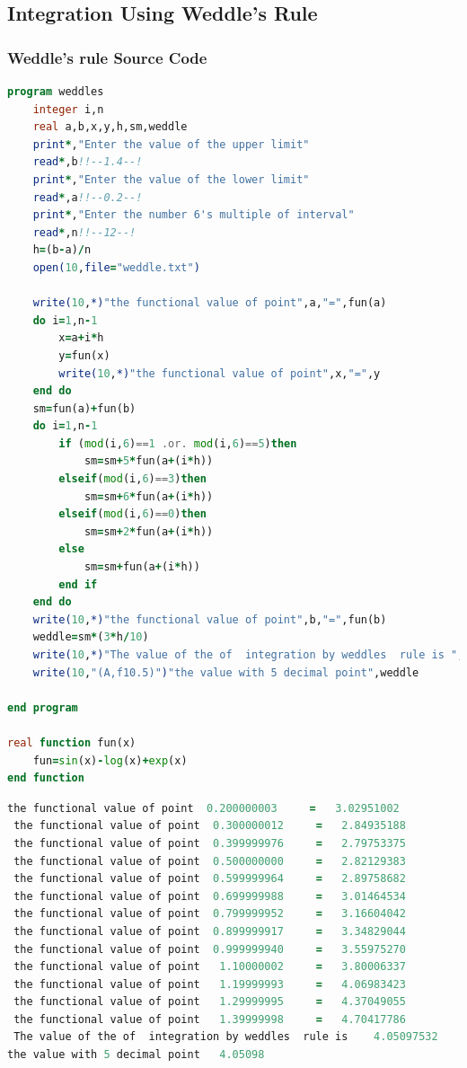 \documentclass{article}
\begin{document}
\subsection{Integration Using Weddle's Rule}
\subsubsection{Weddle's rule Source Code}
\begin{lstlisting}[language=Fortran,caption=Weddle's rule]
program weddles
    integer i,n
    real a,b,x,y,h,sm,weddle
    print*,"Enter the value of the upper limit"
    read*,b!!--1.4--!
    print*,"Enter the value of the lower limit"
    read*,a!!--0.2--!
    print*,"Enter the number 6's multiple of interval"
    read*,n!!--12--!
    h=(b-a)/n
    open(10,file="weddle.txt")

    write(10,*)"the functional value of point",a,"=",fun(a)
    do i=1,n-1
        x=a+i*h
        y=fun(x)
        write(10,*)"the functional value of point",x,"=",y
    end do
    sm=fun(a)+fun(b)
    do i=1,n-1
        if (mod(i,6)==1 .or. mod(i,6)==5)then
            sm=sm+5*fun(a+(i*h))
        elseif(mod(i,6)==3)then
            sm=sm+6*fun(a+(i*h))
        elseif(mod(i,6)==0)then
            sm=sm+2*fun(a+(i*h))
        else
            sm=sm+fun(a+(i*h))
        end if
    end do
    write(10,*)"the functional value of point",b,"=",fun(b)
    weddle=sm*(3*h/10)
    write(10,*)"The value of the of  integration by weddles  rule is ",weddle
    write(10,"(A,f10.5)")"the value with 5 decimal point",weddle

end program

real function fun(x)
    fun=sin(x)-log(x)+exp(x)
end function

\end{lstlisting}
\begin{lstlisting}[language=Fortran,caption= Weddle's rule Output]
 the functional value of point  0.200000003     =   3.02951002    
 the functional value of point  0.300000012     =   2.84935188    
 the functional value of point  0.399999976     =   2.79753375    
 the functional value of point  0.500000000     =   2.82129383    
 the functional value of point  0.599999964     =   2.89758682    
 the functional value of point  0.699999988     =   3.01464534    
 the functional value of point  0.799999952     =   3.16604042    
 the functional value of point  0.899999917     =   3.34829044    
 the functional value of point  0.999999940     =   3.55975270    
 the functional value of point   1.10000002     =   3.80006337    
 the functional value of point   1.19999993     =   4.06983423    
 the functional value of point   1.29999995     =   4.37049055    
 the functional value of point   1.39999998     =   4.70417786    
 The value of the of  integration by weddles  rule is    4.05097532    
the value with 5 decimal point   4.05098

 
\end{lstlisting}
\end{document}
